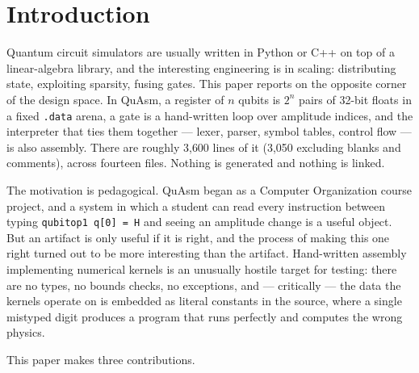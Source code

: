\documentclass[11pt]{article}
\newcommand{\quasm}{QuAsm}
\begin{document}
\section{Introduction}

Quantum circuit simulators are usually written in Python or C++ on top of a linear-algebra
library, and the interesting engineering is in scaling: distributing state, exploiting
sparsity, fusing gates. This paper reports on the opposite corner of the design space. In
\quasm{}, a register of $n$ qubits is $2^n$ pairs of 32-bit floats in a fixed
\texttt{.data} arena, a gate is a hand-written loop over amplitude indices, and the
interpreter that ties them together --- lexer, parser, symbol tables, control flow --- is
also assembly. There are roughly 3{,}600 lines of it (3{,}050 excluding blanks and comments),
across fourteen files. Nothing is generated and nothing is
linked.

The motivation is pedagogical. \quasm{} began as a Computer Organization course project,
and a system in which a student can read every instruction between typing
\texttt{qubitop1 q[0] = H} and seeing an amplitude change is a useful object. But an
artifact is only useful if it is right, and the process of making this one right turned out
to be more interesting than the artifact. Hand-written assembly implementing numerical
kernels is an unusually hostile target for testing: there are no types, no bounds checks,
no exceptions, and --- critically --- the data the kernels operate on is embedded as
literal constants in the source, where a single mistyped digit produces a program that runs
perfectly and computes the wrong physics.

This paper makes three contributions.
\end{document}
